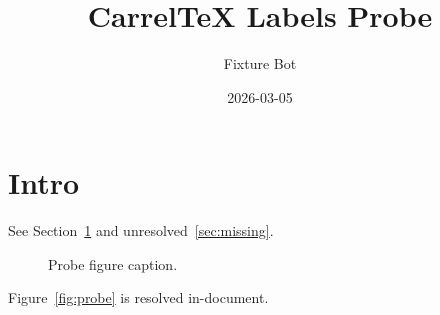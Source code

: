 \documentclass{article}
\title{CarrelTeX Labels Probe}
\author{Fixture Bot}
\date{2026-03-05}
\begin{document}
\maketitle

\section{Intro}\label{sec:intro}
See Section~\ref{sec:intro} and unresolved~\ref{sec:missing}.

\begin{figure}
\caption{Probe figure caption.}
\end{figure}
\label{fig:probe}

Figure~\ref{fig:probe} is resolved in-document.
\end{document}
